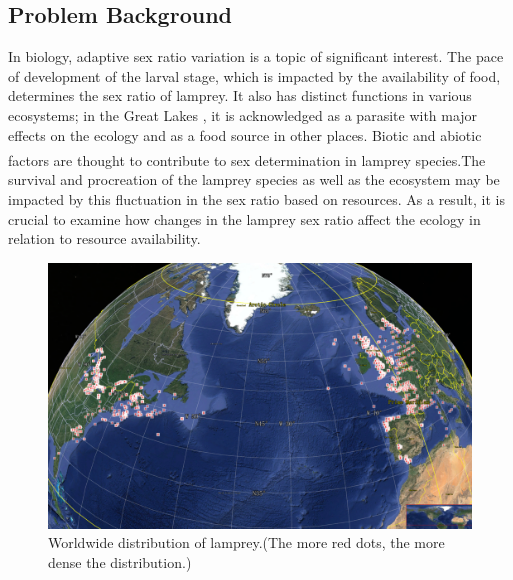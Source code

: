 \documentclass[12pt]{article}  %
\newcommand{\upcite}[1]{\textsuperscript{\textsuperscript{\cite{#1}}}}
\begin{document}
	\subsection{Problem Background}
	In biology, adaptive sex ratio variation is a topic of significant interest. The pace of development of the larval stage, which is impacted by the availability of food, determines the sex ratio of lamprey. It also has distinct functions in various ecosystems; in the Great Lakes , it is acknowledged as a parasite with major effects on the ecology and as a food source in other places. Biotic and abiotic factors are thought to contribute to sex determination in lamprey species.\upcite{1}The survival and procreation of the lamprey species as well as the ecosystem may be impacted by this fluctuation in the sex ratio based on resources. As a result, it is crucial to examine how changes in the lamprey sex ratio affect the ecology in relation to resource availability.
	 \begin{figure}[htbp]  %
		\centering  %
		\includegraphics[width=.9\textwidth]{img/distribution.png} %
		\caption{Worldwide distribution of lamprey.(The more red dots, the more dense the distribution.)} %
		\label{fi:1}
	\end{figure}
	\vspace{-0.8cm}
	
\end{document}
